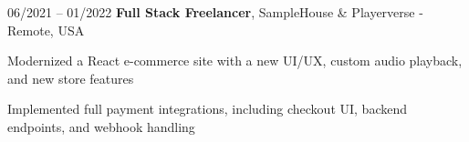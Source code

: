 

\begin{twocolentry}{
    06/2021 – 01/2022
}
\fontsize{11 pt}{11 pt}\textbf{Full Stack Freelancer}, SampleHouse \& Playerverse - Remote, USA\end{twocolentry}

\vspace{0.10 cm}
\begin{onecolentry}
   \begin{highlights}
       \item Modernized a React e-commerce site with a new UI/UX, custom audio playback, and new store features
       \item Implemented full payment integrations, including checkout UI, backend endpoints, and webhook handling
   \end{highlights}
\end{onecolentry}
